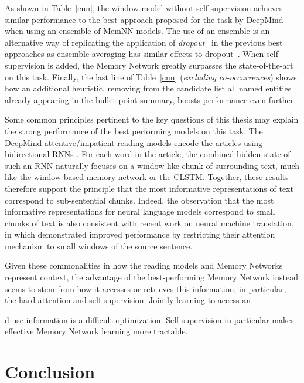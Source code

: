As shown in Table~\ref{cnn}, the window model without self-supervision achieves similar performance to the best approach proposed for the task by DeepMind \citep{nips15_hermann} when using an ensemble of MemNN models. The use of an ensemble  is an alternative way of replicating the application of \emph{dropout}~\citep{hinton2012improving} in the previous best approaches \citep{nips15_hermann} as ensemble averaging has similar effects to dropout~\citep{wan2013regularization}. When self-supervision is added, the Memory Network
greatly surpasses the state-of-the-art on this task.  Finally, the last line of Table~\ref{cnn} (\emph{excluding co-occurrences}) shows how an additional heuristic, removing from the candidate list all named entities already appearing in the bullet point summary, boosts performance even further.


Some common principles pertinent to the key questions of this thesis may explain the strong
performance of the best performing models on this
task. The DeepMind attentive/impatient reading models encode the articles using bidirectional RNNs
\citep{graves2008unconstrained}. For each word in
the article, the combined hidden state of such an RNN naturally
focuses on a window-like chunk of surrounding text, much like the window-based memory network or the CLSTM. Together, these results therefore support the principle that the most informative representations of text correspond to sub-sentential chunks. Indeed, the observation that the most informative representations
for neural language models correspond to small chunks of text is
also consistent with recent work on neural machine translation, in which
\cite{luong2015effective} demonstrated improved performance by
restricting their attention mechanism to small  windows of
the source sentence.


Given these commonalities in how the reading models and Memory
Networks represent context, the advantage of the best-performing
Memory Network instead seems to stem from how it accesses or retrieves
this information; in particular, the hard attention and
self-supervision. Jointly learning to access an


d use information is a
difficult optimization. Self-supervision in particular makes effective
Memory Network learning more tractable.

\section{Conclusion}

